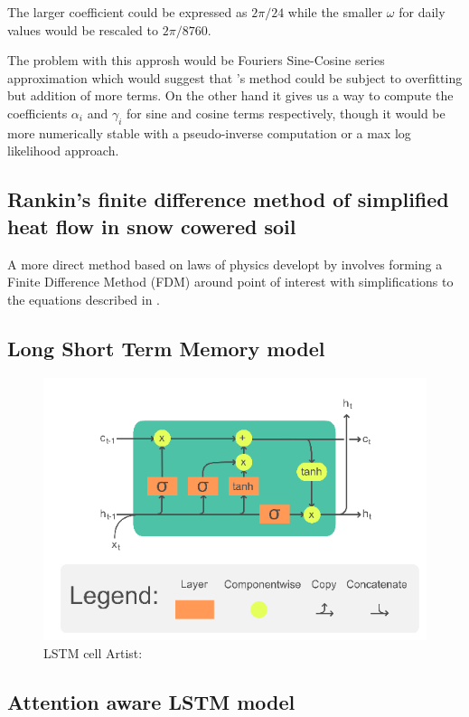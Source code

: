 The larger coefficient could be expressed as $2\pi/24$ while the smaller $\omega$ for daily values would be rescaled to $2\pi/8760$.

The problem with this approsh would be Fouriers Sine-Cosine series approximation which would suggest that \citeauthor{plauborg_simple_2002}'s method could be subject to overfitting but addition of more terms. On the other hand it gives us a way to compute the coefficients $\alpha_i$ and $\gamma_i$ for sine and cosine terms respectively, though it would be more numerically stable with a pseudo-inverse computation or a max log likelihood approach. 

\subsection[Rankin algorithm]{Rankin's finite difference method of simplified heat flow in snow cowered soil}

A more direct method based on laws of physics developt by \citeauthor{karvonen_model_1988} involves forming a Finite Difference Method (FDM) around point of interest with simplifications to the equations described in . 



\subsection{Long Short Term Memory model}

\begin{figure}[ht]
	\centering
	\includegraphics[width=0.7\linewidth]{figures/LSTM_Cell}
	\caption{LSTM cell  Artist: \textcite{chevalier_english_2018}}
	\label{fig:lstmcell}
\end{figure}

\subsection[ILSTM]{Attention aware LSTM model}\cite{li_attention-aware_2022}


